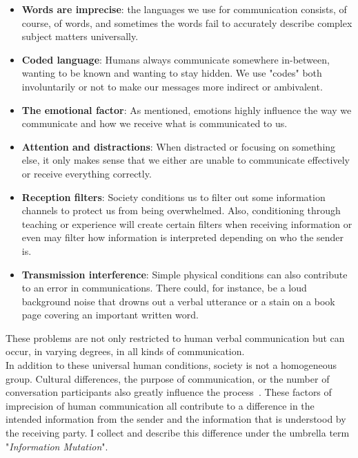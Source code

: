 \begin{itemize}
	\item \textbf{Words are imprecise}: the languages we use for communication consists, of course, of words, and sometimes the words fail to accurately describe complex subject matters universally.
	\item \textbf{Coded language}: Humans always communicate somewhere in-between, wanting to be known and wanting to stay hidden. We use "codes" both involuntarily or not to make our messages more indirect or ambivalent.
	\item \textbf{The emotional factor}: As mentioned, emotions highly influence the way we communicate and how we receive what is communicated to us.
	\item \textbf{Attention and distractions}: When distracted or focusing on something else, it only makes sense that we either are unable to communicate effectively or receive everything correctly.
	\item \textbf{Reception filters}: Society conditions us to filter out some information channels to protect us from being overwhelmed. Also, conditioning through teaching or experience will create certain filters when receiving information or even may filter how information is interpreted depending on who the sender is.
	\item \textbf{Transmission interference}: Simple physical conditions can also contribute to an error in communications. There could, for instance, be a loud background noise that drowns out a verbal utterance or a stain on a book page covering an important written word.
\end{itemize}
These problems are not only restricted to human verbal communication but can occur, in varying degrees, in all kinds of communication.~\cite{Munsaka2014}\\
In addition to these universal human conditions, society is not a homogeneous group. Cultural differences, the purpose of communication, or the number of conversation participants also greatly influence the process~\cite{Chapanis1975}. These factors of imprecision of human communication all contribute to a difference in the intended information from the sender and the information that is understood by the receiving party. I collect and describe this difference under the umbrella term "\textit{Information Mutation}".
